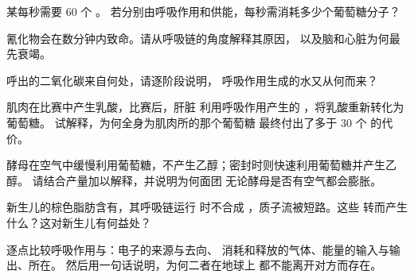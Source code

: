 \begin{exercise}[$\star\star$]\label{exo:g12:respiration-fermentation:9}
某每秒需要 60 个 。
若分别由呼吸作用和供能，每秒需消耗多少个葡萄糖分子？
\end{exercise}

\begin{exercise}[$\star\star$]\label{exo:g12:respiration-fermentation:10}
氰化物会在数分钟内致命。请从呼吸链的角度解释其原因，
以及脑和心脏为何最先衰竭。
\end{exercise}

\begin{exercise}[$\star\star$]\label{exo:g12:respiration-fermentation:11}
呼出的二氧化碳来自何处，请逐阶段说明，
呼吸作用生成的水又从何而来？
\end{exercise}

\begin{exercise}[$\star\star\star$]\label{exo:g12:respiration-fermentation:12}
肌肉在比赛中产生乳酸，比赛后，肝脏
利用呼吸作用产生的 ，将乳酸重新转化为葡萄糖。
试解释，为何全身为肌肉所的那个葡萄糖
最终付出了多于 30 个  的代价。
\end{exercise}

\begin{exercise}[$\star\star\star$]\label{exo:g12:respiration-fermentation:13}
酵母在空气中缓慢利用葡萄糖，不产生乙醇；密封时则快速利用葡萄糖并产生乙醇。
请结合产量加以解释，并说明为何面团
无论酵母是否有空气都会膨胀。
\end{exercise}

\begin{exercise}[$\star\star\star$]\label{exo:g12:respiration-fermentation:14}
新生儿的棕色脂肪含有，其呼吸链运行
时不合成 ，质子流被短路。这些
转而产生什么？这对新生儿有何益处？
\end{exercise}

\begin{exercise}[$\star\star\star$]\label{exo:g12:respiration-fermentation:15}
逐点比较呼吸作用与：电子的来源与去向、
消耗和释放的气体、能量的输入与输出、所在。
然后用一句话说明，为何二者在地球上
都不能离开对方而存在。
\end{exercise}

